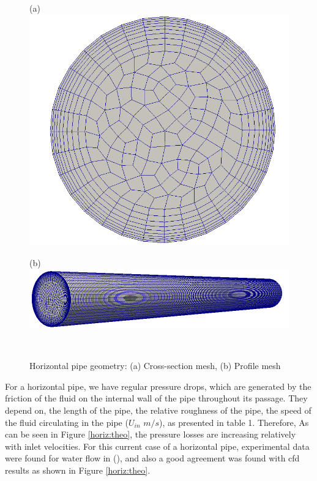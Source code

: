\documentclass[review,3p,times,12pt]{elsarticle}
\begin{document}
\begin{minipage}[t]{0.35\textwidth}
\begin{figure}[H]
\begin{center}
(a)\includegraphics[scale =0.09]{section.png}
    \end{center}
\end{figure}
\end{minipage}\hfill 
 \begin{minipage}[t]{0.5\textwidth}
\begin{figure}[H]
(b)\includegraphics[scale = 0.25]{HP-2.png}
  
\end{figure}
\end{minipage}\\ 
\begin{figure}[H]
    \centering
    \caption{Horizontal pipe geometry: (a) Cross-section mesh, (b) Profile mesh }
      \label{horiz}
\end{figure}
For a horizontal pipe, we have regular pressure drops, which are generated by the friction of the fluid on the internal wall of the pipe throughout its passage. They depend on, the length of the pipe, the relative roughness of the pipe, the speed of the fluid circulating in the pipe ($U_{in}$ $m/s$), as presented in table 1. Therefore, As can be seen in Figure \ref{horiz:theo}, the pressure losses are increasing relatively with inlet velocities. For this current case of a horizontal pipe, experimental data were found for water flow in (\citet{Randal-2004}), and also a good agreement was found with cfd results as shown in Figure \ref{horiz:theo}.\\
\end{document}
